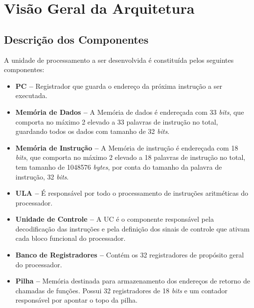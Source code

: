 \documentclass{report}
\begin{document}
\chapter{Visão Geral da Arquitetura}
  \section{Descrição dos Componentes}
  A unidade de processamento a ser desenvolvida é constituída pelos seguintes componentes:
  
  \begin{itemize}
    \item \textbf{PC --} Registrador que guarda o endereço da próxima instrução a ser executada.

    \item \textbf{Memória de Dados --} A Memória de dados é endereçada com 33 \textit{bits}, que comporta no máximo 2 elevado a 33 palavras de instrução no total, guardando todos os dados com tamanho de 32 \textit{bits}.
   
    \item \textbf{Memória de Instrução --} A Memória de instrução é endereçada com 18 \textit{bits}, que comporta no máximo 2 elevado a 18 palavras de instrução no total, tem tamanho de 1048576 \textit{bytes}, por conta do tamanho da palavra de instrução, 32 \textit{bits}.
    
    \item \textbf{ULA --} É responsável por todo o processamento de instruções aritméticas do processador.
    
    \item \textbf{Unidade de Controle --} A UC é o componente responsável pela decodificação das instruções e pela definição dos sinais de controle que ativam cada bloco funcional do processador.
    
    \item \textbf{Banco de Registradores --} Contém os 32 registradores de propósito geral do processador.
    
    \item \textbf{Pilha --} Memória destinada para armazenamento dos endereços de retorno de chamadas de funções. Possui 32 registradores de 18 \textit{bits} e um contador responsável por apontar o topo da pilha.
  \end{itemize}
  \newpage
  
\end{document}
